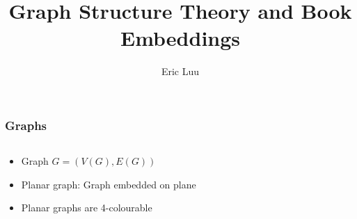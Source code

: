 \documentclass[english]{beamer}
\author{Eric Luu}
\title{Graph Structure Theory and Book Embeddings}
\begin{document}
\frame{\titlepage}

\begin{frame}
    \frametitle{Graphs}

    \begin{columns}
      \begin{column}{0.5\textwidth}
        \begin{itemize}
          \item Graph $G = (V(G), E(G))$
          \item Planar graph: Graph embedded on plane
          \item Planar graphs are 4-colourable \cite{appelEveryPlanarMap1989}
        \end{itemize}
      \end{column}

      \begin{column}{0.5 \textwidth}
        \begin{figure}
          \centering
          
        \end{figure}
      \end{column}
    \end{columns}
\end{frame}
\end{document}
